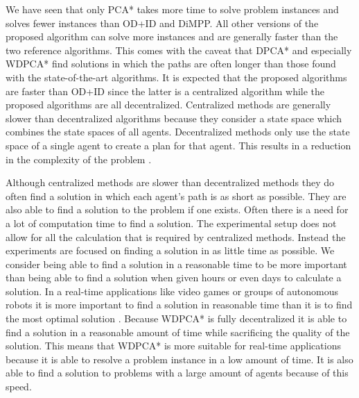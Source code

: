We have seen that only PCA* takes more time to solve problem instances and
solves fewer instances than OD+ID and DiMPP. All other versions of the proposed
algorithm can solve more
instances and are generally faster than the two reference algorithms. This
comes with the caveat that DPCA* and especially WDPCA* find solutions in which
the paths are often longer than those found with the state-of-the-art
algorithms. It is expected that the proposed algorithms are faster than OD+ID
since the latter is a centralized algorithm while the proposed algorithms are
all decentralized. Centralized methods are generally slower than decentralized
algorithms because they consider a state space which combines the state spaces
of all agents. Decentralized methods only use the state space of a single agent
to create a plan for that agent. This results in a reduction in the complexity
of the problem \citep{bennewitz2002,sharon2013}.

Although centralized methods are slower than decentralized methods they do often
find a solution in which each agent's path is as short as possible. They are
also able to find a solution to the problem if one exists. Often there is a
need for a lot of computation time to find a solution. The experimental setup
does not allow for all the calculation that is required by centralized methods.
Instead the experiments are focused on finding a solution in as
little time as possible. We consider being able to find a solution in
a reasonable time to be more important than being able to find a solution when
given hours or even days to calculate a solution. In a real-time applications
like video games or groups of autonomous robots it is more important to find a
solution in reasonable time than it is to find the most optimal solution
\citep{botea2013}.
Because WDPCA* is fully decentralized it is able to find a solution in a
reasonable amount of time while sacrificing the quality of the solution. This
means that WDPCA* is more suitable for real-time applications because it is
able to resolve a problem instance in a low amount of time. It is also able to
find a solution to problems with a large amount of agents because of this speed.

